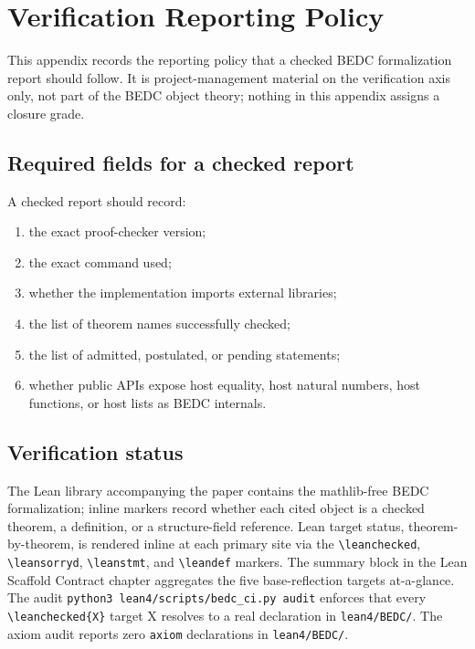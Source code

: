 \chapter{Verification Reporting Policy}
\label{app:build-log}

This appendix records the reporting policy that a checked BEDC formalization report should follow. It is project-management material on the verification axis only, not part of the BEDC object theory; nothing in this appendix assigns a closure grade.

\section{Required fields for a checked report}
\label{sec:checked-report-fields}

A checked report should record:
\begin{enumerate}
  \item the exact proof-checker version;
  \item the exact command used;
  \item whether the implementation imports external libraries;
  \item the list of theorem names successfully checked;
  \item the list of admitted, postulated, or pending statements;
  \item whether public APIs expose host equality, host natural numbers, host functions, or host lists as BEDC internals.
\end{enumerate}

\section{Verification status}
\label{sec:appendix-verification-status}

The Lean library accompanying the paper contains the mathlib-free BEDC formalization; inline markers record whether each cited object is a checked theorem, a definition, or a structure-field reference. Lean target status, theorem-by-theorem, is rendered inline at each primary site via the \texttt{\textbackslash leanchecked}, \texttt{\textbackslash leansorryd}, \texttt{\textbackslash leanstmt}, and \texttt{\textbackslash leandef} markers. The summary block in the Lean Scaffold Contract chapter aggregates the five base-reflection targets at-a-glance. The audit \texttt{python3 lean4/scripts/bedc\_ci.py audit} enforces that every \texttt{\textbackslash leanchecked\{X\}} target X resolves to a real declaration in \texttt{lean4/BEDC/}. The axiom audit reports zero \texttt{axiom} declarations in \texttt{lean4/BEDC/}.

